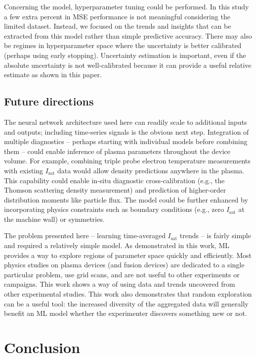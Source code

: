 Concerning the model, hyperparameter tuning could be performed. In this study a few extra percent in MSE performance is not meaningful considering the limited dataset. Instead, we focused on the trends and insights that can be extracted from this model rather than simple predictive accuracy. There may also be regimes in hyperparameter space where the uncertainty is better calibrated (perhaps using early stopping). Uncertainty estimation is important, even if the absolute uncertainty is not well-calibrated because it can provide a useful relative estimate as shown in this paper. 

\subsection{Future directions}

The neural network architecture used here can readily scale to additional inputs and outputs; including time-series signals is the obvious next step. Integration of multiple diagnostics -- perhaps starting with individual models before combining them -- could enable inference of plasma parameters throughout the device volume. For example, combining triple probe electron temperature measurements with existing $I_\text{sat}$ data would allow density predictions anywhere in the plasma. This capability could enable in-situ diagnostic cross-calibration (e.g., the Thomson scattering density measurement) and prediction of higher-order distribution moments like particle flux. The model could be further enhanced by incorporating physics constraints such as boundary conditions (e.g., zero $I_\text{sat}$ at the machine wall) or symmetries. 

The problem presented here -- learning time-averaged $I_\text{sat}$ trends -- is fairly simple and required a relatively simple model. As demonstrated in this work, ML provides a way to explore regions of parameter space quickly and efficiently. Most physics studies on plasma devices (and fusion devices) are dedicated to a single particular problem, use grid scans, and are not useful to other experiments or campaigns. This work shows a way of using data and trends uncovered from other experimental studies. This work also demonstrates that random exploration can be a useful tool: the increased diversity of the aggregated data will generally benefit an ML model whether the experimenter discovers something new or not.

\section{Conclusion}
\label{chp_isat_sec:conclusion}

